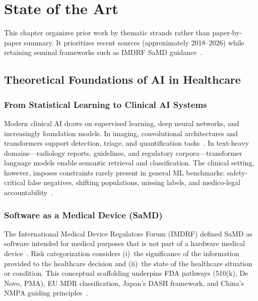 \chapter{State of the Art}
\label{ch:sota}

This chapter organizes prior work by thematic strands rather than paper-by-paper summary. It prioritizes recent sources (approximately 2018--2026) while retaining seminal frameworks such as IMDRF SaMD guidance~\cite{imdrf2014}.

\section{Theoretical Foundations of AI in Healthcare}
\label{sec:foundations}

\subsection{From Statistical Learning to Clinical AI Systems}

Modern clinical AI draws on supervised learning, deep neural networks, and increasingly foundation models. In imaging, convolutional architectures and transformers support detection, triage, and quantification tasks~\cite{rajpurkar2022}. In text-heavy domains---radiology reports, guidelines, and regulatory corpora---transformer language models enable semantic retrieval and classification. The clinical setting, however, imposes constraints rarely present in general ML benchmarks: safety-critical false negatives, shifting populations, missing labels, and medico-legal accountability~\cite{topol2019,char2018}.

\subsection{Software as a Medical Device (SaMD)}

The International Medical Device Regulators Forum (IMDRF) defined SaMD as software intended for medical purposes that is not part of a hardware medical device~\cite{imdrf2014}. Risk categorization considers (i)~the significance of the information provided to the healthcare decision and (ii)~the state of the healthcare situation or condition. This conceptual scaffolding underpins FDA pathways (510(k), De Novo, PMA), EU MDR classification, Japan's DASH framework, and China's NMPA guiding principles~\cite{fda2021,pmda2020,nmpa2021,euaiact2024}.

